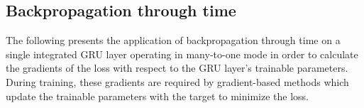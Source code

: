 %



\subsection*{Backpropagation through time}
The following presents the application 
of backpropagation through time
on a single integrated GRU layer
operating in many-to-one mode
in order to calculate
the gradients of the loss with respect to 
the GRU layer's trainable parameters.
During training,
these gradients are required
by gradient-based methods which update the trainable 
parameters with the target to minimize the loss.








